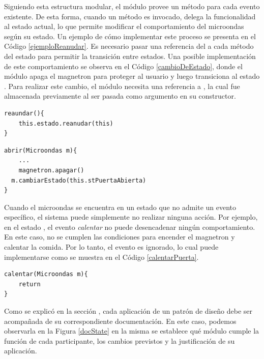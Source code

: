 Siguiendo esta estructura modular, el módulo \Microondas provee un método para cada evento existente. De esta forma, cuando un método es invocado, delega la funcionalidad al estado actual, lo que permite modificar el comportamiento del microondas según su estado. Un ejemplo de cómo implementar este proceso se presenta en el Código \ref{ejemploReanudar}. Es necesario pasar una referencia del \Microondas a cada método del estado para permitir la transición entre estados. Una posible implementación de este comportamiento se observa en el Código \ref{cambioDeEstado}, donde el módulo \Calentando apaga el \gls{magnetron} para proteger al usuario y luego transiciona al estado \PuertaAbierta. Para realizar este cambio, el módulo \Calentando necesita una referencia a \PuertaAbierta, la cual fue almacenada previamente al ser pasada como argumento en su constructor.

\begin{lstlisting}[caption=Ejemplo de implementación método reaundar del módulo Microondas, label=ejemploReanudar]
reaundar(){
    this.estado.reanudar(this)
}
\end{lstlisting}
\begin{lstlisting}[caption=Ejemplo de implementación método abrir del módulo Calentando, label=cambioDeEstado]
abrir(Microondas m){
	...
	magnetron.apagar()
  m.cambiarEstado(this.stPuertaAbierta)
}
\end{lstlisting}

Cuando el microondas se encuentra en un estado que no admite un evento específico, el sistema puede simplemente no realizar ninguna acción. Por ejemplo, en el estado \PuertaAbierta, el evento \textit{calentar} no puede desencadenar ningún comportamiento. En este caso, no se cumplen las condiciones para encender el \gls{magnetron} y calentar la comida. Por lo tanto, el evento es ignorado, lo cual puede implementarse como se muestra en el Código \ref{calentarPuerta}.
\begin{lstlisting}[caption=Ejemplo de implementación método calentar del módulo PuertaAbierta, label=calentarPuerta]
calentar(Microondas m){
	return
}
\end{lstlisting}

Como se explicó en la sección , cada aplicación de un patrón de diseño debe ser acompañada de su correspondiente documentación. En este caso, podemos observarla en la Figura \ref{docState} en la misma se establece qué módulo cumple la función de cada participante, los cambios previstos y la justificación de su aplicación.

